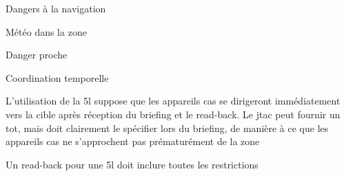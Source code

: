 				\item Dangers à la navigation
				\item Météo dans la zone
				\item Danger proche
				\item Coordination temporelle
			\ed
			\item L'utilisation de la \gls{5l} suppose que les appareils \gls{cas} se dirigeront immédiatement vers la cible après réception du briefing et le read-back. Le \gls{jtac} peut fournir un \gls{tot}, mais doit clairement le spécifier lors du briefing, de manière à ce que les appareils \gls{cas} ne s'approchent pas prématurément de la zone
		\ed
		\item Un read-back pour une \gls{5l} doit inclure toutes les restrictions

	\ed
\ed